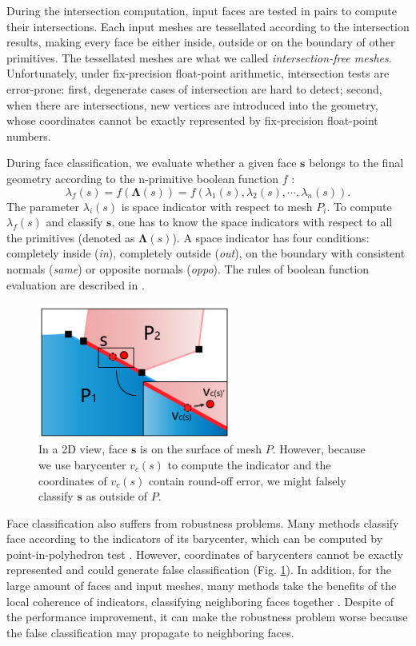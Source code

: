 \documentclass[10pt,journal,compsoc]{IEEEtran}
\begin{document}
During the intersection computation, input faces are tested in pairs to compute their intersections. Each input meshes are tessellated according to the intersection results, making every face be either inside, outside or on the boundary of other primitives. The tessellated meshes are what we called \emph{intersection-free meshes}. Unfortunately, under fix-precision float-point arithmetic, intersection tests are error-prone: first, degenerate cases of intersection are hard to detect; second, when there are intersections, new vertices are introduced into the geometry, whose coordinates cannot be exactly represented by fix-precision float-point numbers.

During face classification, we evaluate whether a given face $\bm{s}$ belongs to the final geometry according to the n-primitive boolean function $f$ :
\begin{equation}
\lambda_f(s) = f(\boldsymbol{\Lambda}(s)) = f(\lambda_1(s), \lambda_2(s), \cdots, \lambda_n(s)).
\end{equation}
The parameter $\lambda_i(s)$ is space indicator with respect to mesh $P_i$. To compute $\lambda_f(s)$ and classify $\bm{s}$, one has to know the space indicators with respect to all the primitives (denoted as $\boldsymbol{\Lambda}(s)$). A space indicator has four conditions: completely inside (\emph{in}), completely outside (\emph{out}), on the boundary with consistent normals (\emph{same}) or opposite normals (\emph{oppo}). The rules of boolean function evaluation are described in \cite{douze2015quickcsg,feito2013fast}.

\begin{figure}[t]
\centering
\includegraphics[width=2.5in]{falseclass}
\caption{In a 2D view, face $\bm{s}$ is on the surface of mesh $P$. However, because we use barycenter $v_c(s)$ to compute the indicator  and the coordinates of $v_c(s)$ contain round-off error, we might falsely classify $\bm{s}$ as outside of $P$.}
\label{fig:falseclass}
\end{figure}

Face classification also suffers from robustness problems. Many methods classify face according to the indicators of its barycenter, which can be computed by point-in-polyhedron test \cite{feito2013fast,campen2010exact}. However, coordinates of barycenters cannot be exactly represented and could generate false classification (Fig. \ref{fig:falseclass}). In addition, for the large amount of faces and input meshes, many methods take the benefits of the local coherence of indicators, classifying neighboring faces together \cite{pavic2010hybrid,feito2013fast,ogayar2015deferred,zhou2016mesh}. Despite of the performance improvement, it can make the robustness problem worse because the false classification may propagate to neighboring faces.
\end{document}
